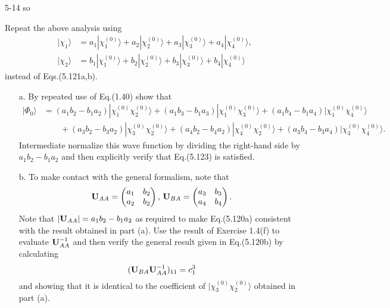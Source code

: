 \documentclass[a4paper]{book}
\newcommand{\U}{{\bf U}}
\begin{document}
	\begin{solution}
		5-14 so
	\end{solution}
	
	\begin{exercise}
	Repeat the above analysis using
	\begin{align*}
		| \chi_1 \rangle &= a_1 | \chi^{(0)}_1 \rangle + a_2 | \chi^{(0)}_2 \rangle + a_3 | \chi^{(0)}_3 \rangle + a_4 | \chi^{(0)}_4 \rangle, \\
		| \chi_2 \rangle &= b_1 | \chi^{(0)}_1 \rangle + b_2 | \chi^{(0)}_2 \rangle + b_3 | \chi^{(0)}_3 \rangle + b_4 | \chi^{(0)}_4 \rangle
	\end{align*}
	instead of Eqs.(5.121a,b).
	\begin{enumerate}
	
	\item[a.] By repeated use of Eq.(1.40) show that
	\begin{align*}
		| \Phi_0 \rangle &= ( a_1 b_2 - b_1 a_2 ) | \chi^{(0)}_1 \chi^{(0)}_2 \rangle + ( a_1 b_3 - b_1 a_3 ) | \chi^{(0)}_1 \chi^{(0)}_3 \rangle + ( a_1 b_4 - b_1 a_4 ) | \chi^{(0)}_1 \chi^{(0)}_4 \rangle \\
		&\hspace{2em} + ( a_3 b_2 - b_3 a_2 ) | \chi^{(0)}_3 \chi^{(0)}_2 \rangle + ( a_4 b_2 - b_4 a_2 ) | \chi^{(0)}_4 \chi^{(0)}_2 \rangle + ( a_3 b_4 - b_3 a_4 ) | \chi^{(0)}_3 \chi^{(0)}_4 \rangle .
	\end{align*}
	Intermediate normalize this wave function by dividing the right-hand side by $a_1 b_2 - b_1 a_2$ and then explicitly verify that Eq.(5.123) is satisfied.
	
	\item[b.] To make contact with the general formalism, note that
	\[
		\U_{AA} = \begin{pmatrix} a_1 & b_2 \\ a_2 & b_2 \end{pmatrix}, \, \U_{BA} = \begin{pmatrix} a_3 & b_3 \\ a_4 & b_4 \end{pmatrix}.
	\]
	Note that $|\U_{AA}| = a_1 b_2 - b_1 a_2$ as required to make Eq.(5.120a) consistent with the result obtained in part (a). Use the result of Exercise 1.4(f) to evaluate $\U^{-1}_{AA}$ and then verify the general result given in Eq.(5.120b) by calculating
	\[
		(\U_{BA}\U^{-1}_{AA})_{11} = c^3_1	
	\]
	and showing that it is identical to the coefficient of $| \chi^{(0)}_3 \chi^{(0)}_2 \rangle$ obtained in part (a).
	\end{enumerate}
	\end{exercise}
	
\end{document}
